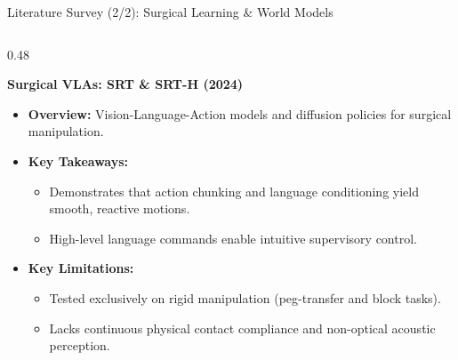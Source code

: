 \documentclass[aspectratio=169, 10pt]{beamer}
\begin{document}
\begin{frame}{Literature Survey (2/2): Surgical Learning \& World Models}
    \begin{columns}[T]
        \begin{column}{0.48\textwidth}
            \begin{block}{\textbf{Surgical VLAs: SRT \& SRT-H (2024)}}
                \begin{itemize}\itemsep=3pt
                    \item \textbf{Overview:} Vision-Language-Action models and diffusion policies for surgical manipulation.
                    \item \textbf{Key Takeaways:}
                    \begin{itemize}\itemsep=2pt
                        \item Demonstrates that action chunking and language conditioning yield smooth, reactive motions.
                        \item High-level language commands enable intuitive supervisory control.
                    \end{itemize}
                    \item \textcolor{accentorange}{\textbf{Key Limitations:}}
                    \begin{itemize}\itemsep=2pt
                        \item Tested exclusively on rigid manipulation (peg-transfer and block tasks).
                        \item Lacks continuous physical contact compliance and non-optical acoustic perception.
                    \end{itemize}
                \end{itemize}
            \end{block}
        \end{column}


\end{columns}
\end{frame}
\end{document}
